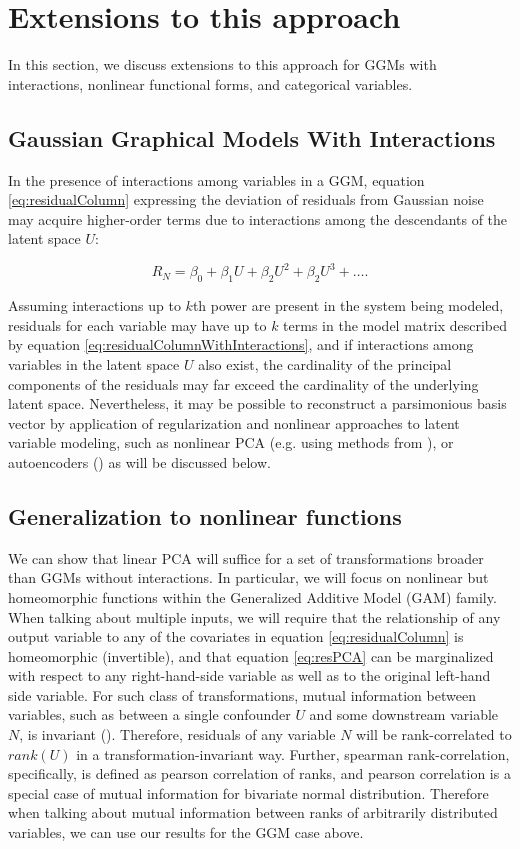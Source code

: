 \documentclass{article}
\begin{document}
\section{Extensions to this approach}
In this section, we discuss extensions to this approach for GGMs with interactions, nonlinear functional forms, and categorical variables. 

\subsection{Gaussian Graphical Models With Interactions}
In the presence of interactions among variables in a GGM, equation \ref{eq:residualColumn} expressing the deviation of residuals from Gaussian noise may acquire higher-order terms due to interactions among the descendants of the latent space $U$:

\begin{equation}
R_N = \beta_0 + \beta_1 U + \beta_2 U^2 + \beta_2 U^3 + \dots.
\label{eq:residualColumnWithInteractions}
\end{equation}

Assuming interactions up to $k$th power are present in the system being modeled, residuals for each variable may have up to $k$ terms in the model matrix described by equation \ref{eq:residualColumnWithInteractions}, and if interactions among variables in the latent space $U$ also exist, the cardinality of the principal components of the residuals may far exceed the cardinality of the underlying latent space.  Nevertheless, it may be possible to reconstruct a parsimonious basis vector by application of regularization and nonlinear approaches to latent variable modeling, such as nonlinear PCA (e.g. using methods from \cite{karatzoglou_kernlab_2004}), or autoencoders (\cite{louizos_causal_2017}) as will be discussed below.

\subsection{Generalization to nonlinear functions}
We can show that linear PCA will suffice for a set of transformations broader than GGMs without interactions.  In particular, we will focus on nonlinear but homeomorphic functions within the Generalized Additive Model (GAM) family.  When talking about multiple inputs, we will require that the relationship of any output variable to any of the covariates in equation \ref{eq:residualColumn} is homeomorphic (invertible), and that equation \ref{eq:resPCA} can be marginalized with respect to any right-hand-side variable as well as to the original left-hand side variable.  For such class of transformations, mutual information between variables, such as between a single confounder $U$ and some downstream variable $N$, is invariant (\cite{kraskov_estimating_2004}).  Therefore, residuals of any variable $N$ will be rank-correlated to $rank(U)$ in a transformation-invariant way. Further, spearman rank-correlation, specifically, is defined as pearson correlation of ranks, and pearson correlation is a special case of mutual information for bivariate normal distribution.  Therefore when talking about mutual information between ranks of arbitrarily distributed variables, we can use our results for the GGM case above.
\end{document}
